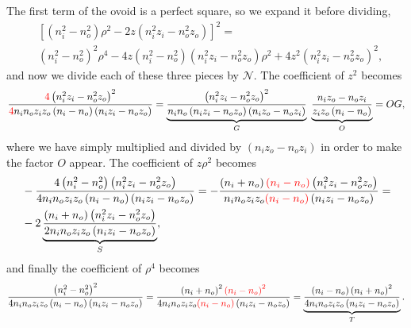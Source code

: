                The first term of the ovoid is a perfect square, so we expand it before dividing,
                \begin{align*}
                    & \left[ \left(n_i^2-n_o^2\right)\rho^2 - 2z\left( n_i^2z_i - n_o^2z_o \right) \right]^2 = \\
                    & \left(n_i^2-n_o^2\right)^2\rho^4 - 4z\left(n_i^2-n_o^2\right)\left( n_i^2z_i - n_o^2z_o \right)\rho^2 + 4z^2\left( n_i^2z_i-n_o^2z_o \right)^2,
                \end{align*}
                and now we divide each of these three pieces by $\mathcal{N}$. The coefficient of $z^2$ becomes
                \begin{equation*}
                    \frac{ {\color{red} 4}\left( n_i^2z_i-n_o^2z_o \right)^2}{ {\color{red} 4}n_in_oz_iz_o\left( n_i-n_o \right)\left( n_iz_i-n_oz_o \right)} = \underbrace{\frac{\left( n_i^2z_i-n_o^2z_o \right)^2}{n_in_o\left( n_iz_i-n_oz_o \right)\left( n_iz_o-n_oz_i \right)}}_{G}\;\underbrace{\frac{n_iz_o-n_oz_i}{z_iz_o\left(n_i-n_o\right)}}_{O} = OG,
                \end{equation*}
                where we have simply multiplied and divided by $\left( n_iz_o - n_oz_i \right)$ in order to make the factor $O$ appear. The coefficient of $z\rho^2$ becomes
                \begin{align*}
                    & -\frac{4\left(n_i^2-n_o^2\right)\left( n_i^2z_i-n_o^2z_o \right)}{4n_in_oz_iz_o\left( n_i-n_o \right)\left( n_iz_i-n_oz_o \right)} = -\frac{\left(n_i+n_o\right) {\color{red} \left(n_i-n_o\right)}\left( n_i^2z_i-n_o^2z_o \right)}{n_in_oz_iz_o {\color{red} \left( n_i-n_o \right)}\left( n_iz_i-n_oz_o \right)} = \\
                    & -2\underbrace{\frac{\left(n_i+n_o\right)\left( n_i^2z_i - n_o^2z_o \right)}{2n_in_oz_iz_o\left( n_iz_i-n_oz_o \right)}}_{S},
                \end{align*}
                and finally the coefficient of $\rho^4$ becomes
                \begin{equation*}
                    \frac{\left(n_i^2-n_o^2\right)^2}{4n_in_oz_iz_o\left( n_i-n_o \right)\left( n_iz_i-n_oz_o \right)} = \frac{\left(n_i+n_o\right)^2 {\color{red} \left(n_i-n_o\right)^2}}{4n_in_oz_iz_o {\color{red} \left( n_i-n_o \right)}\left( n_iz_i-n_oz_o \right)} = \underbrace{\frac{\left(n_i-n_o\right)\left(n_i+n_o\right)^2}{4n_in_oz_iz_o\left( n_iz_i-n_oz_o \right)}}_{T}.
                \end{equation*}


